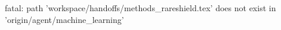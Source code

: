 fatal: path 'workspace/handoffs/methods_rareshield.tex' does not exist in 'origin/agent/machine_learning'
